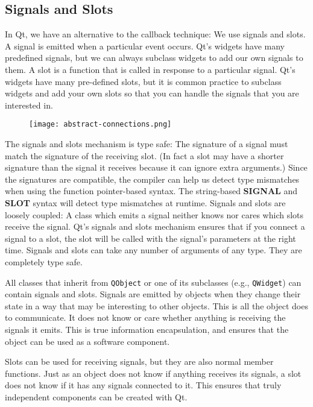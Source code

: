 \subsection{Signals and Slots}
\label{ssec:soft-sig-solt-detail}
In Qt, we have an alternative to the callback technique: We use signals and
slots. A signal is emitted when a particular event occurs. Qt's widgets have
many predefined signals, but we can always subclass widgets to add our own
signals to them. A slot is a function that is called in response to a particular
signal. Qt's widgets have many pre-defined slots, but it is common practice to
subclass widgets and add your own slots so that you can handle the signals that
you are interested in.\hfill \break
%
%
\begin{figure}[htb]
	\centering
	\texttt{[image: abstract-connections.png]}
	\label{fig:software-signal-slots-scheme}
\end{figure}
%
\newline The signals and slots mechanism is type safe: The signature of a signal must
match the signature of the receiving slot. (In fact a slot may have a shorter
signature than the signal it receives because it can ignore extra arguments.)
Since the signatures are compatible, the compiler can help us detect type
mismatches when using the function pointer-based syntax. The string-based
\textbf{SIGNAL} and \textbf{SLOT} syntax will detect type mismatches at runtime.
Signals and slots are loosely coupled: A class which emits a signal neither
knows nor cares which slots receive the signal. Qt's signals and slots mechanism
ensures that if you connect a signal to a slot, the slot will be called with the
signal's parameters at the right time. Signals and slots can take any number of
arguments of any type. They are completely type safe.

All classes that inherit from \texttt{QObject} or one of its subclasses (e.g.,
\texttt{QWidget}) can contain signals and slots. Signals are emitted by objects
when they change their state in a way that may be interesting to other objects.
This is all the object does to communicate. It does not know or care whether
anything is receiving the signals it emits. This is true information
encapsulation, and ensures that the object can be used as a software component.

Slots can be used for receiving signals, but they are also normal member
functions. Just as an object does not know if anything receives its signals, a
slot does not know if it has any signals connected to it. This ensures that
truly independent components can be created with Qt.

